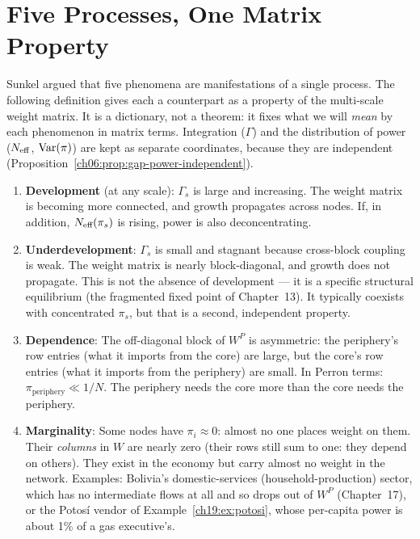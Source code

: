\documentclass[../structural_economics_book.tex]{subfiles}
\begin{document}
\section{Five Processes, One Matrix Property}
\label{ch19:sec:five}

Sunkel argued that five phenomena are manifestations of a single process. The following definition gives each a counterpart as a property of the multi-scale weight matrix. It is a dictionary, not a theorem: it fixes what we will \emph{mean} by each phenomenon in matrix terms. Integration ($\Gamma$) and the distribution of power ($N_{\text{eff}}$, $\operatorname{Var}(\pi)$) are kept as separate coordinates, because they are independent (Proposition~\ref{ch06:prop:gap-power-independent}).

\begin{definition}\label{ch19:thm:five}
\begin{enumerate}
\item \textbf{Development} (at any scale): $\Gamma_s$ is large and increasing. The weight matrix is becoming more connected, and growth propagates across nodes. If, in addition, $N_{\text{eff}}(\pi_s)$ is rising, power is also deconcentrating.

\item \textbf{Underdevelopment}: $\Gamma_s$ is small and stagnant because cross-block coupling is weak. The weight matrix is nearly block-diagonal, and growth does not propagate. This is not the absence of development --- it is a specific structural equilibrium (the fragmented fixed point of Chapter~13). It typically coexists with concentrated $\pi_s$, but that is a second, independent property.

\item \textbf{Dependence}: The off-diagonal block of $W^P$ is asymmetric: the periphery's row entries (what it imports from the core) are large, but the core's row entries (what it imports from the periphery) are small. In Perron terms: $\pi_{\text{periphery}} \ll 1/N$. The periphery needs the core more than the core needs the periphery.

\item \textbf{Marginality}: Some nodes have $\pi_i \approx 0$: almost no one places weight on them. Their \emph{columns} in $W$ are nearly zero (their rows still sum to one: they depend on others). They exist in the economy but carry almost no weight in the network. Examples: Bolivia's domestic-services (household-production) sector, which has no intermediate flows at all and so drops out of $W^P$ (Chapter~17), or the Potos\'{i} vendor of Example~\ref{ch19:ex:potosi}, whose per-capita power is about 1\% of a gas executive's.


\end{enumerate}
\end{definition}
\end{document}

